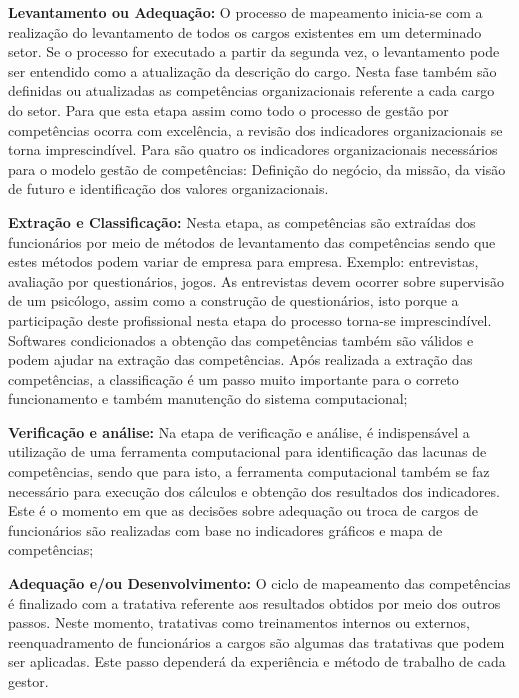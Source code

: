 \begin{alineas}

\item \textbf{Levantamento ou Adequação:} O processo de mapeamento inicia-se com a realização do levantamento de todos os cargos existentes em um determinado setor. Se o processo for executado a partir da segunda vez, o levantamento pode ser entendido como a atualização da descrição do cargo. Nesta fase também são definidas ou atualizadas as competências organizacionais referente a cada cargo do setor.
Para que esta etapa assim como todo o processo de gestão por competências ocorra com excelência, a revisão dos indicadores organizacionais se torna imprescindível. Para  são quatro os indicadores organizacionais necessários para o modelo gestão de competências: Definição do negócio, da missão, da visão de futuro e identificação dos valores organizacionais.
\item \textbf{Extração e Classificação:} Nesta etapa, as competências são extraídas dos funcionários por meio de métodos de levantamento das competências sendo que estes métodos podem variar de empresa para empresa. Exemplo: entrevistas, avaliação por questionários, jogos.
As entrevistas devem ocorrer sobre supervisão de um psicólogo, assim como a construção de questionários, isto porque a participação deste profissional nesta etapa do processo torna-se imprescindível. Softwares condicionados a obtenção das competências também são válidos e podem ajudar na extração das competências.
Após realizada a extração das competências, a classificação é um passo muito importante para o correto funcionamento e também manutenção do sistema computacional;
\item \textbf{Verificação e análise:} Na etapa de verificação e análise, é indispensável a utilização de uma ferramenta computacional para identificação das lacunas de competências, sendo que para isto, a ferramenta computacional também se faz necessário para execução dos cálculos e obtenção dos resultados dos indicadores. Este é o momento em que as decisões sobre adequação ou troca de cargos de funcionários são realizadas com base no indicadores gráficos e mapa de competências;
\item \textbf{Adequação e/ou Desenvolvimento:} O ciclo de mapeamento das competências é finalizado com a tratativa referente aos resultados obtidos por meio dos outros passos. Neste momento, tratativas como treinamentos internos ou externos, reenquadramento de funcionários a cargos são algumas das tratativas que podem ser aplicadas. Este passo dependerá da experiência e método de trabalho de cada gestor.

\end{alineas}

